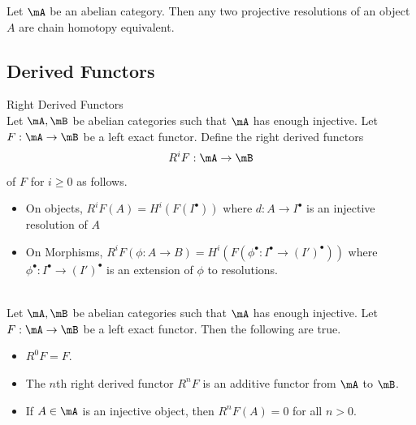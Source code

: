 \documentclass[a4paper]{article}
\begin{document}
\begin{lmm}{}{} Let $\mA$ be an abelian category. Then any two projective resolutions of an object $A$ are chain homotopy equivalent. 
\end{lmm}

\subsection{Derived Functors}
\begin{defn}{Right Derived Functors}{}\\
Let $\mA,\mB$ be abelian categories such that $\mA$ has enough injective. Let $F:\mA\to\mB$ be a left exact functor. Define the right derived functors $$R^iF:\mA\to\mB$$ of $F$ for $i\geq 0$ as follows. 
\begin{itemize}
\item On objects, $R^iF(A)=H^i(F(I^\bullet))$ where $d:A\to I^\bullet$ is an injective resolution of $A$
\item On Morphisms, $R^iF(\phi:A\to B)=H^i(F(\phi^\bullet:I^\bullet\to (I')^\bullet))$ where $\phi^\bullet:I^\bullet\to(I')^\bullet$ is an extension of $\phi$ to resolutions. 
\end{itemize}
\end{defn}

\begin{prp}{}{}\\
Let $\mA,\mB$ be abelian categories such that $\mA$ has enough injective. Let $F:\mA\to\mB$ be a left exact functor. Then the following are true. 
\begin{itemize}
\item $R^0F=F$. 
\item The $n$th right derived functor $R^nF$ is an additive functor from $\mA$ to $\mB$. 
\item If $A\in\mA$ is an injective object, then $R^nF(A)=0$ for all $n>0$. 
\end{itemize}
\end{prp}
\end{document}
